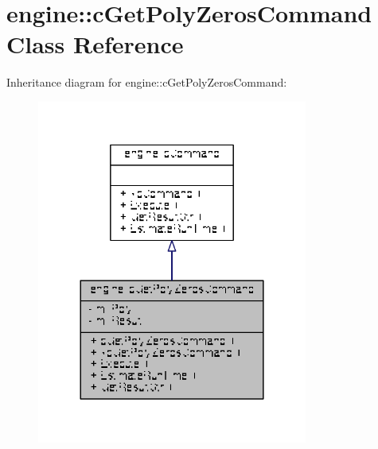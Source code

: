\hypertarget{classengine_1_1cGetPolyZerosCommand}{\section{engine\-:\-:c\-Get\-Poly\-Zeros\-Command Class Reference}
\label{classengine_1_1cGetPolyZerosCommand}
}


Inheritance diagram for engine\-:\-:c\-Get\-Poly\-Zeros\-Command\-:
\nopagebreak
\begin{figure}[H]
\begin{center}
\leavevmode
\includegraphics[width=252pt]{classengine_1_1cGetPolyZerosCommand__inherit__graph}
\end{center}
\end{figure}


